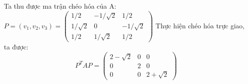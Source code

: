 \documentclass{article}
\begin{document}
Ta thu được ma trận chéo hóa của A: \(
P = (v_1, v_2, v_3) = \begin{pmatrix}
    1/2 & -1/ \sqrt2 & 1/2  \\
    1/ \sqrt2  & 0 & -1/ \sqrt2 \\
    1/2  & 1/ \sqrt2  & 1/2
\end{pmatrix} \)
\newline Thực hiện chéo hóa trực giao, ta được:
\[
    P^TAP = \begin{pmatrix}
        2 - \sqrt2 & 0 & 0 \\ 0 & 2 & 0 \\ 0 & 0 & 2 + \sqrt2
    \end{pmatrix}
\]
\end{document}
